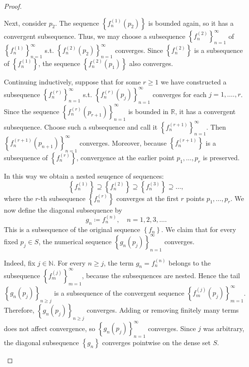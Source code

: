 \begin{proof}
\begin{itemize}
        Next, consider \(p_2\). The sequence \(\left\{ f_n^{(1)}(p_2) \right\} \) is bounded again, so it has a convergent subsequence. Thus, we may choose a subsequence \(\left\{ f_n^{(2)} \right\}_{n=1}^{\infty}  \) of \(\left\{ f_n^{(1)} \right\}_{n=1}^{\infty}  \) s.t. \(\left\{ f_n^{(2)}(p_2) \right\}_{n=1}^{\infty}  \) converges. Since \(\left\{ f_n^{(2)} \right\} \) is a subsequence of \(\left\{ f_n^{(1)} \right\} \), the sequence \(\left\{ f_n^{(2)}(p_1) \right\} \) also converges. 

        Continuing inductively, suppose that for some \(r \ge 1\) we have constructed a subsequence \(\left\{ f_n^{(r)} \right\}_{n=1}^{\infty}  \) s.t. \(\left\{ f_n^{(r)} (p_j) \right\}_{n=1}^{\infty}  \) converges for each \(j = 1, \dots ., r\). Since the sequence \(\left\{ f_n^{(r)} (p_{r+1}) \right\}_{n=1}^{\infty}  \) is bounded in \(\mathbb{R}\), it has a convergent subsequence. Choose such a subsequence and call it \(\left\{ f_n^{(r+1)} \right\}_{n=1}^{\infty} \). Then \(\left\{ f_n^{(r+1)} (p_{n+1}) \right\}_{n=1}^{\infty} \) converges. Moreover, because \(\left\{ f_n^{(r+1)} \right\} \) is a subsequence of \(\left\{ f_n^{(r)} \right\} \), convergence at the earlier point \(p_1, \dots , p_r\) is preserved. 

        In this way we obtain a nested seuqence of sequences:
        \[
            \left\{ f_n^{(1)} \right\} \supseteq \left\{ f_n^{(2)} \right\} \supseteq \left\{ f_n^{(3)} \right\} \supseteq \dots ,   
        \]
        where the \(r\)-th subsequence \(\left\{ f_n^{(r)} \right\} \) converges at the first \(r\) points \(p_1, \dots , p_r\). We now define the diagonal subsequence by 
        \[
            g_n \coloneqq f_n^{(n)}, \quad n = 1, 2, 3, \dots. 
        \]    
        This is a subsequence of the original sequence \(\left\{ f_n \right\} \). We claim that for every fixed \(p_j \in S\), the numerical sequence \(\left\{ g_n (p_j) \right\}_{n=1}^{\infty}  \) converges.  

        Indeed, fix \(j \in \mathbb{N}\). For every \(n \ge j\), the term \(g_n = f_n^{(n)}\) belongs to the subsequence \(\left\{ f_m^{(j)} \right\}_{m=1}^{\infty} \), because the subsequences are nested. Hence the tail \(\left\{ g_n (p_j) \right\}_{n \ge j} \) is a subsequence of the convergent sequence \(\left\{ f_m^{(j)} (p_j) \right\}_{m=1}^{\infty}  \). Therefore, \(\left\{ g_n (p_j) \right\}_{n \ge j} \) converges. Adding or removing finitely many terms does not affect convergence, so \(\left\{ g_n (p_j) \right\}_{n=1}^{\infty}  \) converges. Since \(j\) was arbitrary, the diagonal subsequence \(\left\{ g_n \right\} \) converges pointwise on the dense set \(S\). 


\end{itemize}
\end{proof}
